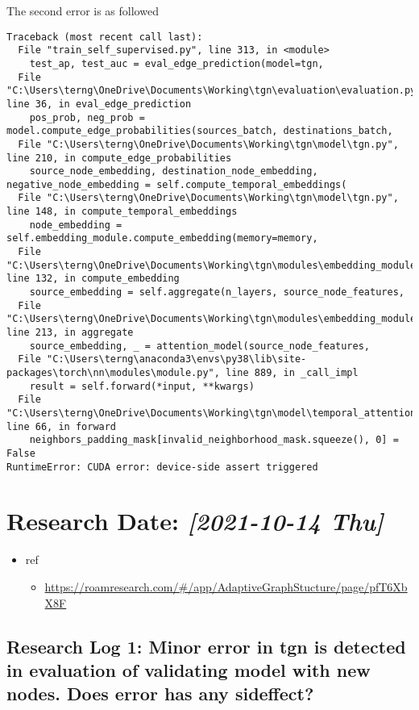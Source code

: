 \documentclass[11pt]{article}
\begin{document}
The second error is as followed
\begin{verbatim}
Traceback (most recent call last):
  File "train_self_supervised.py", line 313, in <module>
    test_ap, test_auc = eval_edge_prediction(model=tgn,
  File "C:\Users\terng\OneDrive\Documents\Working\tgn\evaluation\evaluation.py", line 36, in eval_edge_prediction
    pos_prob, neg_prob = model.compute_edge_probabilities(sources_batch, destinations_batch,
  File "C:\Users\terng\OneDrive\Documents\Working\tgn\model\tgn.py", line 210, in compute_edge_probabilities
    source_node_embedding, destination_node_embedding, negative_node_embedding = self.compute_temporal_embeddings(
  File "C:\Users\terng\OneDrive\Documents\Working\tgn\model\tgn.py", line 148, in compute_temporal_embeddings
    node_embedding = self.embedding_module.compute_embedding(memory=memory,
  File "C:\Users\terng\OneDrive\Documents\Working\tgn\modules\embedding_module.py", line 132, in compute_embedding
    source_embedding = self.aggregate(n_layers, source_node_features,
  File "C:\Users\terng\OneDrive\Documents\Working\tgn\modules\embedding_module.py", line 213, in aggregate
    source_embedding, _ = attention_model(source_node_features,
  File "C:\Users\terng\anaconda3\envs\py38\lib\site-packages\torch\nn\modules\module.py", line 889, in _call_impl
    result = self.forward(*input, **kwargs)
  File "C:\Users\terng\OneDrive\Documents\Working\tgn\model\temporal_attention.py", line 66, in forward
    neighbors_padding_mask[invalid_neighborhood_mask.squeeze(), 0] = False
RuntimeError: CUDA error: device-side assert triggered
\end{verbatim}
\section{Research Date: \textit{[2021-10-14 Thu]}}
\label{sec:orga47b601}
\begin{itemize}
\item ref
\begin{itemize}
\item \url{https://roamresearch.com/\#/app/AdaptiveGraphStucture/page/pfT6XbX8F}
\end{itemize}
\end{itemize}
\subsection{Research Log 1: Minor error in tgn is detected in evaluation of validating model with new nodes. Does error has any sideffect?}
\label{sec:org8e3253f}
\end{document}
